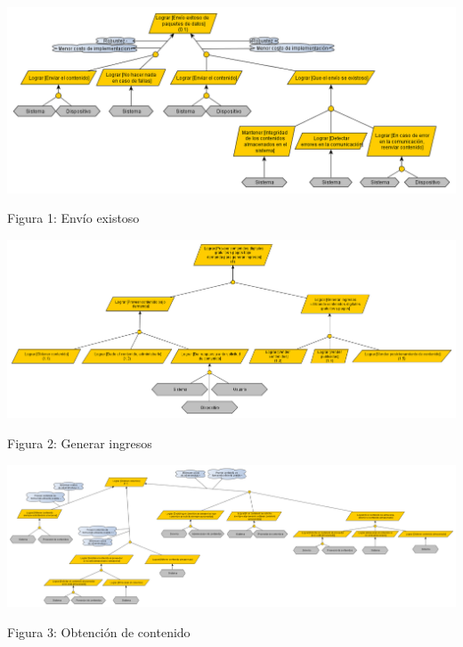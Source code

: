 \documentclass[11pt, a4paper, spanish]{article}
\begin{document}
\newpage
	\begin{center}
		\includegraphics[scale=0.60, angle=90]{Diagramas/0-1ModelodeObjetivosEnvioexitoso.png}
	\end{center}
	\begin{center}
		\small{Figura 1: Env\'io existoso}
	\end{center}
\newpage
	\begin{center}
		\includegraphics[scale=0.45, angle=90]{Diagramas/1ModelodeObjetivosGenerarIngresos.png}
	\end{center}
	\begin{center}
		\small{Figura 2: Generar ingresos}
	\end{center}
\newpage
	\begin{center}
		\includegraphics[scale=0.28, angle=90]{Diagramas/1-1ModelodeObjetivosObtenercontenido.png}
	\end{center}
	\begin{center}
		\small{Figura 3: Obtenci\'on de contenido}
	\end{center}
\end{document}
